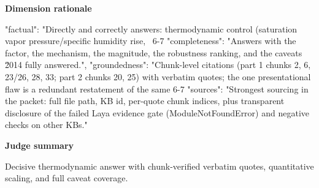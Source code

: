 \documentclass[10pt]{article}
\begin{document}
\textbf{Dimension rationale}
\begin{EvidenceText}
{
  "factual": "Directly and correctly answers: thermodynamic control (saturation vapor pressure/specific humidity rise, ~6-7%
  "completeness": "Answers with the factor, the mechanism, the magnitude, the robustness ranking, and the caveats \u2014 fully answered.",
  "groundedness": "Chunk-level citations (part 1 chunks 2, 6, 23/26, 28, 33; part 2 chunks 20, 25) with verbatim quotes; the one presentational flaw is a redundant restatement of the same 6-7%
  "sources": "Strongest sourcing in the packet: full file path, KB id, per-quote chunk indices, plus transparent disclosure of the failed Laya evidence gate (ModuleNotFoundError) and negative checks on other KBs."
}
\end{EvidenceText}

\textbf{Judge summary}
\begin{EvidenceText}
Decisive thermodynamic answer with chunk-verified verbatim quotes, quantitative scaling, and full caveat coverage.
\end{EvidenceText}
\end{document}
